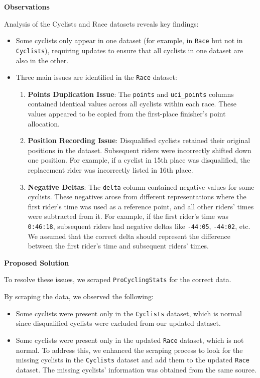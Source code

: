 \documentclass[a4paper, twoside]{article}
\begin{document}
\textbf{Observations}

Analysis of the Cyclists and Race datasets reveals key findings:
\begin{itemize}[noitemsep]
    \item Some cyclists only appear in one dataset (for example, in \texttt{Race} but not in \texttt{Cyclists}), requiring updates to ensure that all cyclists in one dataset are also in the other.
    \item Three main issues are identified in the \texttt{Race} dataset:
    \begin{enumerate}[noitemsep]
        \item \textbf{Points Duplication Issue}: The \texttt{points} and \texttt{uci\_points} columns contained identical values across all cyclists within each race. These values appeared to be copied from the first-place finisher's point allocation.
        \item \textbf{Position Recording Issue}: Disqualified cyclists retained their original positions in the dataset. Subsequent riders were incorrectly shifted down one position. For example, if a cyclist in 15th place was disqualified, the replacement rider was incorrectly listed in 16th place.
        \item \textbf{Negative Deltas}: The \texttt{delta} column contained negative values for some cyclists. These negatives arose from different representations where the first rider's time was used as a reference point, and all other riders' times were subtracted from it. For example, if the first rider's time was \texttt{0:46:18}, subsequent riders had negative deltas like \texttt{-44:05}, \texttt{-44:02}, etc. We assumed that the correct delta should represent the difference between the first rider's time and subsequent riders' times.
    \end{enumerate}
\end{itemize}

\textbf{Proposed Solution}

To resolve these issues, we scraped \texttt{ProCyclingStats} for the correct data. 

By scraping the data, we observed the following:
\begin{itemize}[noitemsep]
    \item Some cyclists were present only in the \texttt{Cyclists} dataset, which is normal since disqualified cyclists were excluded from our updated dataset.
    \item Some cyclists were present only in the updated \texttt{Race} dataset, which is not normal. To address this, we enhanced the scraping process to look for the missing cyclists in the \texttt{Cyclists} dataset and add them to the updated \texttt{Race} dataset. The missing cyclists' information was obtained from the same source.
\end{itemize}
\end{document}
